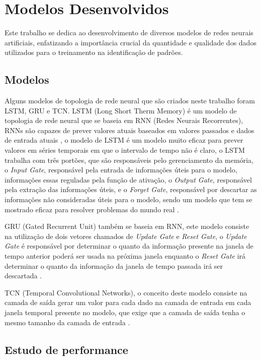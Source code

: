 \chapter{Modelos Desenvolvidos}
\label{ch:solucao_proposta}

Este trabalho se dedica ao desenvolvimento de diversos modelos de redes neurais artificiais, enfatizando a importância crucial da quantidade e qualidade dos dados utilizados para o treinamento na identificação de padrões.

\section{Modelos}

Alguns modelos de topologia de rede neural que são criados neste trabalho foram LSTM, GRU e TCN. LSTM (Long Short Therm Memory) é um modelo de topologia de rede neural que se baseia em RNN (Redes Neurais Recorrentes), RNNs são capazes de prever valores atuais baseados em valores passados e dados de entrada atuais \cite{Yu2019}, o modelo de LSTM é um modelo muito eficaz para prever valores em séries temporais em que o intervalo de tempo não é claro, o LSTM trabalha com três portões, que são responsáveis pelo gerenciamento da memória, o \textit{Input Gate}, responsável pela entrada de informações úteis para o modelo, informações essas reguladas pela função de ativação, o \textit{Output Gate}, responsável pela extração das informações úteis, e o \textit{Forget Gate}, responsável por descartar as informações não consideradas úteis para o modelo, sendo um modelo que tem se mostrado eficaz para resolver problemas do mundo real \cite{Duan2016}.

GRU (Gated Recurrent Unit) também se baseia em RNN, este modelo consiste na utilização de dois vetores chamados de \textit{Update Gate} e \textit{Reset Gate}, o \textit{Update Gate} é responsável por determinar o quanto da informação presente na janela de tempo anterior poderá ser usada na próxima janela enquanto o \textit{Reset Gate} irá determinar o quanto da informação da janela de tempo passada irá ser descartada \cite{Kostadinov2017}.

TCN (Temporal Convolutional Networks), o conceito deste modelo consiste na camada de saída gerar um valor para cada dado na camada de entrada em cada janela temporal presente no modelo, que exige que a camada de saída tenha o mesmo tamanho da camada de entrada \cite{He2019}.

\section{Estudo de performance}

